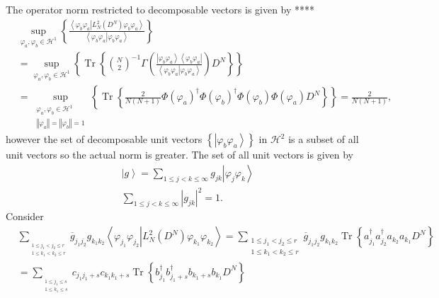 \documentclass[aps,preprint]{revtex4}%
\begin{document}
The operator norm restricted to decomposable vectors is given by ****
\begin{align}
&  \sup_{\varphi_{a},\varphi_{b}\in\mathcal{H}^{1}}\left\{  \frac{\left\langle
\left.  \varphi_{b}\varphi_{a}\right\vert L_{N}^{2}\left(  D^{N}\right)
\varphi_{b}\varphi_{a}\right\rangle }{\left\langle \left.  \varphi_{b}%
\varphi_{a}\right\vert \varphi_{b}\varphi_{a}\right\rangle }\right\}
\nonumber\\
&  \left.  =\right.  \sup_{\varphi_{a},\varphi_{b}\in\mathcal{H}^{1}}\left\{
\operatorname{Tr}\left\{  \binom{N}{2}^{-1}\Gamma\left(  \frac{\left\vert
\varphi_{b}\varphi_{a}\right\rangle \left\langle \varphi_{b}\varphi
_{a}\right\vert }{\left\langle \left.  \varphi_{b}\varphi_{a}\right\vert
\varphi_{b}\varphi_{a}\right\rangle }\right)  D^{N}\right\}  \right\}
\nonumber\\
&  \left.  =\right.  \sup_{\substack{\varphi_{a},\varphi_{b}\in\mathcal{H}%
^{1}\\\left\Vert \varphi_{a}\right\Vert =\left\Vert \varphi_{b}\right\Vert
=1}}\left\{  \operatorname{Tr}\left\{  \frac{2}{N\left(  N+1\right)  }%
\Phi\left(  \varphi_{a}\right)  ^{\dagger}\Phi\left(  \varphi_{b}\right)
^{\dagger}\Phi\left(  \varphi_{b}\right)  \Phi\left(  \varphi_{a}\right)
D^{N}\right\}  \right\}  =\frac{2}{N\left(  N+1\right)  },
\end{align}
however the set of decomposable unit vectors $\left\{  \left\vert \varphi
_{b}\varphi_{a}\right\rangle \right\}  $ in $\mathcal{H}^{2}$ is a subset of
all unit vectors so the actual norm is greater. The set of all unit vectors is
given by
\begin{align}
&  \left\vert g\right\rangle =\sum_{1\leq j<k\leq\infty}g_{jk}\left\vert
\varphi_{j}\varphi_{k}\right\rangle \\
&  \sum_{1\leq j<k\leq\infty}\left\vert g_{jk}\right\vert ^{2}=1.
\end{align}
Consider
\begin{align}
&  \sum_{_{\substack{1\leq j_{1}<j_{2}\leq r\\1\leq k_{1}<k_{2}\leq r}%
}}\overline{g}_{j_{1}j_{2}}g_{k_{1}k_{2}}\left\langle \left.  \varphi_{j_{1}%
}\varphi_{j_{2}}\right\vert L_{N}^{2}\left(  D^{N}\right)  \varphi_{k_{1}%
}\varphi_{k_{2}}\right\rangle =\sum_{\substack{1\leq j_{1}<j_{2}\leq r\\1\leq
k_{1}<k_{2}\leq r}}\overline{g}_{j_{1}j_{2}}g_{k_{1}k_{2}}\operatorname{Tr}%
\left\{  a_{j_{1}}^{\dagger}a_{j_{2}}^{\dagger}a_{k_{2}}a_{k_{1}}D^{N}\right\}
\\
&  =\sum_{_{\substack{1\leq j_{1}\leq s\\1\leq k_{1}\leq s}}}c_{j_{1}j_{1}%
+s}c_{k_{1}k_{1}+s}\operatorname{Tr}\left\{  b_{j_{1}}^{\dagger}b_{j_{1}%
+s}^{\dagger}b_{k_{1}+s}b_{k_{1}}D^{N}\right\}
\end{align}
\end{document}
